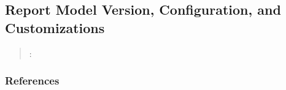



\subsection{Report Model Version, Configuration, and Customizations}
\label{sec:report-model-version-configuration-and-customizations}

\begin{quote}
\summary: 
\end{quote}



\subsubsection{References}





